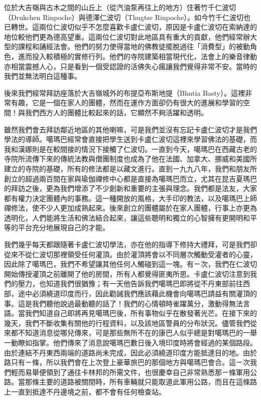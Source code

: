 位於大吉嶺與古木之間的山丘上（從汽油泵再往上的地方）住著竹千仁波切（Drukchen
Rinpoche）與德澤仁波切（Thugtse
Rinpoche）。如今竹千仁波切也已轉世。這兩位仁波切似乎不怎麼喜歡卡盧仁波切，原因是卡盧仁波切在索納達的地位較他們更為德高望重。這兩位仁波切對此地區具有重大的貢獻，他們經常辦大型的課程和誦經法會。他們的努力使得當地的佛教徒擺脫過往「消費型」的被動角色，進而投入較積極的實修行列。他們的寺院建築相當現代化，法會上的樂音律動亦相當震撼人心，只是看到一個受認證的活佛失心瘋讓我們覺得非常不安。當時的我們並無法明白這種事。

後來我們經常拜訪座落於大吉嶺城外的布提亞布斯地提（Bhutia
Basty）。這裡非常有趣，它是一個在家人的團體，然而在運作方面卻仍有很大的進展和學習的空間！與我們西方人的團體比較起來的話，它顯然不夠活躍和透明。

雖然我們會去拜訪鄰近地區的其他喇嘛，可是我們並沒有忘記卡盧仁波切才是我們學法的導師。噶瑪巴經常會直接把學生送到卡盧仁波切這裡來學習佛法的基礎，而我和漢娜則是在較間接的情況下接觸了仁波切。一直到今天，噶瑪巴在西藏古老的寺院所流傳下來的傳統法教與僧團制度也成為了他在法國、加拿大、挪威和美國所建立的寺院的基礎，所有的修法都是以藏文進行。直到ㄧ九九八年，我們和朋友所創立的超過兩百間在家與瑜伽禪修中心都是直接為噶瑪巴而立，尤其在昆吉夏瑪巴的拜訪之後，更為我們增添了不少創新和重要的主張與理念。我們都是法友，大家都有權力決定團體內的事務。這一種開放的風格，大手印的教法，以及噶瑪巴上師禪修法，使不少人更加成熟起來。後來創立的團體屬於在家人團體，行事上亦更為透明化，人們能將生活和佛法結合起來，讓這些聰明和獨立的心智擁有更開明和平等的平台充分地展現自己的才能。

我們幾乎每天都跟隨著卡盧仁波切學法，亦在他的指導下修持大禮拜，可是我們卻從來不從仁波切那裡領受任何灌頂。由於灌頂將會以不同層次觸動受灌者的心靈，因此除了噶瑪巴，我們不希望讓其他任何人觸碰到這一塊。有ㄧ次，我們在仁波切開始傳授灌頂之前離開了他的房間，所有人都覺得匪夷所思。卡盧仁波切注意到我們的壓力，也知道我們很猶豫；有一天他告訴我們噶瑪巴即將從不丹東部前往西部，途中必須繞道印度而行，因此勸誡我們應該藉此機會向噶瑪巴請益有關灌頂的事。這是我們聽他說過最動聽的話了！我們的心情頓時雀躍萬分，激動得無法言語。當我們知道自己即將再見噶瑪巴後，所有事物似乎在散發著光芒。在接下來的幾天，我們不斷收集有關他的行程資料，以及該地區警員的分布狀況。儘管我們從來都不知道消息從哪兒傳來，可是那些無所不在的康巴人似乎總是對噶瑪巴的一舉一動瞭如指掌。他們傳來了消息說噶瑪巴數日後入境印度時將會經過的某個路段。由於連結不丹東西兩端的道路尚未完成，因此必須繞道印度方能抵達目的地。由於路只有ㄧ條，所以我們會在上次登上豪華旅巴的那個地方與噶瑪巴會合。這ㄧ次我們輕而易舉便領到了通往卡林邦的所需文件，也很慶幸自己非常熟悉那ㄧ條軍用公路。當那條主要的道路被關閉時，所有車輛就只能取道此軍用公路，而且在這條路上一直到抵達不丹邊境之前，都不會有任何檢查站。

